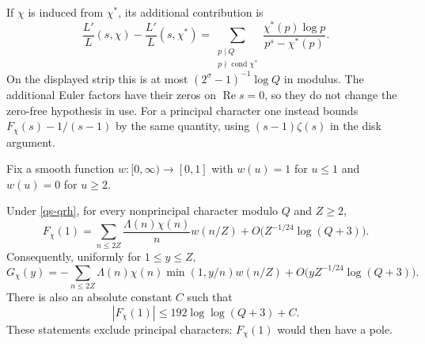 If $\chi$ is induced from $\chi^*$, its additional contribution is
\[
 \frac{L'}L(s,\chi)-\frac{L'}L(s,\chi^*)
 =\sum_{\substack{p\mid Q\\p\nmid\operatorname{cond}\chi^*}}
       \frac{\chi^*(p)\log p}{p^s-\chi^*(p)}.
\]
On the displayed strip this is at most
$(2^\sigma-1)^{-1}\log Q$ in modulus. The additional Euler
factors have their zeros on $\operatorname{Re}s=0$, so they do
not change the zero-free hypothesis in use. For a principal
character one instead bounds $F_\chi(s)-1/(s-1)$ by the same
quantity, using $(s-1)\zeta(s)$ in the disk argument.

Fix a smooth function $w:[0,\infty)\to[0,1]$ with
$w(u)=1$ for $u\le1$ and $w(u)=0$ for $u\ge2$.

\begin{lemma}\label{qs-cutoff}
Under \eqref{qs-qrh}, for every nonprincipal character modulo $Q$
and $Z\ge2$,
\[
 F_\chi(1)=\sum_{n\le2Z}\frac{\Lambda(n)\chi(n)}n w(n/Z)
       +O\bigl(Z^{-1/24}\log(Q+3)\bigr).
\]
Consequently, uniformly for $1\le y\le Z$,
\begin{equation}\label{qs-smooth-identity}
 G_\chi(y)=-\sum_{n\le2Z}\Lambda(n)\chi(n)
                    \min(1,y/n)w(n/Z)
       +O\bigl(yZ^{-1/24}\log(Q+3)\bigr).
\end{equation}
There is also an absolute constant $C$ such that
\begin{equation}\label{qs-loglog}
 |F_\chi(1)|\le192\log\log(Q+3)+C.
\end{equation}
These statements exclude principal characters: $F_\chi(1)$ would
then have a pole.
\end{lemma}
